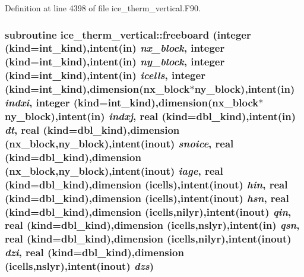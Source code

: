 Definition at line 4398 of file ice\_\-therm\_\-vertical.F90.\hypertarget{namespaceice__therm__vertical_af560526921bc546f96377e533243089f}{
\subsubsection[{freeboard}]{\setlength{\rightskip}{0pt plus 5cm}subroutine ice\_\-therm\_\-vertical::freeboard (integer (kind=int\_\-kind),intent(in) {\em nx\_\-block}, \/  integer (kind=int\_\-kind),intent(in) {\em ny\_\-block}, \/  integer (kind=int\_\-kind),intent(in) {\em icells}, \/  integer (kind=int\_\-kind),dimension(nx\_\-block$\ast$ny\_\-block),intent(in) {\em indxi}, \/  integer (kind=int\_\-kind),dimension(nx\_\-block$\ast$ny\_\-block),intent(in) {\em indxj}, \/  real (kind=dbl\_\-kind),intent(in) {\em dt}, \/  real (kind=dbl\_\-kind),dimension (nx\_\-block,ny\_\-block),intent(inout) {\em snoice}, \/  real (kind=dbl\_\-kind),dimension (nx\_\-block,ny\_\-block),intent(inout) {\em iage}, \/  real (kind=dbl\_\-kind),dimension (icells),intent(inout) {\em hin}, \/  real (kind=dbl\_\-kind),dimension (icells),intent(inout) {\em hsn}, \/  real (kind=dbl\_\-kind),dimension (icells,nilyr),intent(inout) {\em qin}, \/  real (kind=dbl\_\-kind),dimension (icells,nslyr),intent(in) {\em qsn}, \/  real (kind=dbl\_\-kind),dimension (icells,nilyr),intent(inout) {\em dzi}, \/  real (kind=dbl\_\-kind),dimension (icells,nslyr),intent(inout) {\em dzs})}}
\label{namespaceice__therm__vertical_af560526921bc546f96377e533243089f}


